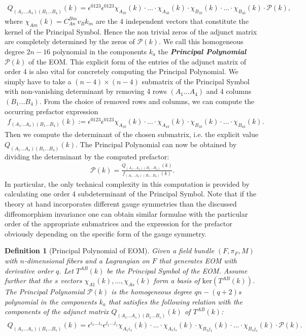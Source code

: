 \documentclass[a4paper,12pt, DIV=14, BCOR=5mm, twoside, headsepline, numbers=noenddot]{scrbook}
\newtheorem{definition}{Definition}[section]
\begin{document}
\begin{align}\label{diffeoMinor}
    Q_{(A_1...A_4) (B_1...B_4)}(k) = \epsilon^{0123} \epsilon^{0123} \chi_{A_10}(k) \cdot ... \cdot \chi_{A_43}(k) \cdot \chi_{B_10}(k) \cdot ... \cdot \chi_{B_43}(k) \cdot \mathcal{P}(k),
\end{align}
% 
%
%
%
where $\chi_{Am}(k) = C^{Bm}_{An} v_B k_m$ are the 4 independent vectors that constitute the kernel of the Principal Symbol. Hence the non trivial zeros of the adjunct matrix are completely determined by the zeros of $\mathcal{P}(k)$. We call this homogeneous degree $2n-16$ polynomial in the components $k_a$ the \textit{\textbf{Principal Polynomial}}  $\mathcal{P}(k)$ of the EOM.
This explicit form of the entries of the adjunct matrix of order 4 is also vital for concretely computing the Principal Polynomial. We simply have to take a $(n-4) \times (n-4)$ submatrix of the Principal Symbol with non-vanishing determinant by removing 4 rows $(A_1...A_4)$ and 4 columns $(B_1...B_4)$. From the choice of removed rows and columns, we can compute the occurring prefactor expression 
\begin{align}\label{prefacF}
f_{(A_1...A_4)(B_1...B_4)}(k) := \epsilon^{0123} \epsilon^{0123} \chi_{A_10}(k) \cdot ... \cdot \chi_{A_43}(k) \cdot \chi_{B_10}(k) \cdot ... \cdot \chi_{B_43}(k).
\end{align}
Then we compute the determinant of the chosen submatrix, i.e. the explicit value $Q_{(A_1...A_4)(B_1...B_4)}(k)$. The Principal Polynomial can now be obtained by dividing the determinant by the computed prefactor:
\begin{align}
    \mathcal{P}(k) = \frac{Q_{(A_1...A_4)(B_1...B_4)}(k)}{f_{(A_1...A_4)(B_1...B_4)}(k)}.
\end{align}
In particular, the only technical complexity in this computation is provided by calculating one order 4 subdeterminant of the Principal Symbol. 
Note that if the theory at hand incorporates different gauge symmetries than the discussed diffeomorphism invariance one can obtain similar formulae with the particular order of the appropriate submatrices and the expression for the prefactor obviously depending on the specific form of the gauge symmetry.
\begin{definition}[Principal Polynomial of EOM]
Given a field bundle $(F,\pi_F,M)$ with $n$-dimensional fibers and a Lagrangian on $F$ that generates EOM with derivative order $q$. Let  $T^{AB}(k)$ be the Principal Symbol of the EOM. Assume further that the $s$ vectors $\chi_{A1}(k),...,\chi_{As}(k)$ form a basis of $\mathrm{ker}(T^{AB}(k))$. The Principal Polynomial $\mathcal{P}(k)$
is the homogeneous degree $qn - (q+2)s$ polynomial in the components $k_a$ that satisfies the following relation with the components of the adjunct matrix $Q_{(A_1...A_s)(B_1...B_s)}(k)$ of $T^{AB}(k)$:
\begin{align}
   Q_{(A_1...A_s)(B_1...B_s)}(k) = \epsilon^{i_1...i_s} \epsilon^{j_1...j_s} \chi_{A_1i_1}(k)\cdot ... \cdot \chi_{A_si_s}(k) \cdot \chi_{B_1j_1}(k) \cdot ... \cdot \chi_{B_sj_s}(k) \cdot \mathcal{P}(k).
\end{align}
\end{definition}
\end{document}
